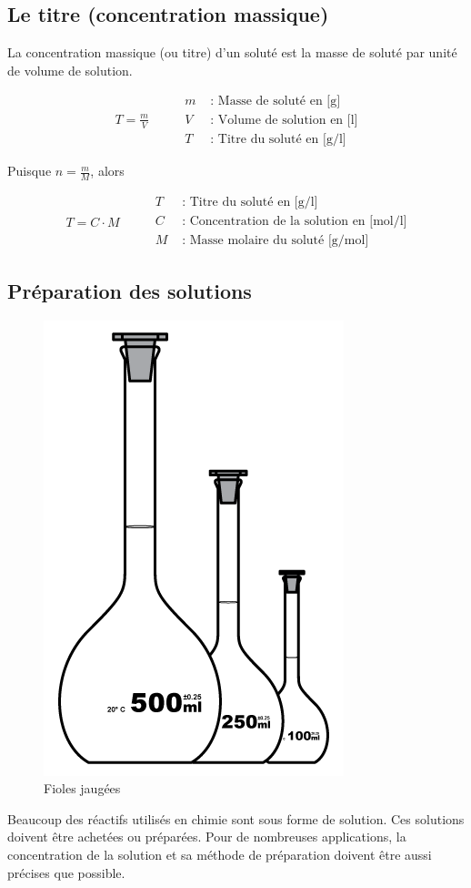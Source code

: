 \documentclass[
  11pt,
  a4paper,
  openany]{book}
\begin{document}
\subsection{Le titre (concentration massique)}\label{le-titre-concentration-massique}

La concentration massique (ou titre) d'un soluté est la masse de soluté par unité de volume de solution.

\[
\begin{split}
  T = \frac{m}{V}
\end{split}
\qquad
\begin{split}
  m &\text{ : Masse de soluté en [g]} \\
  V &\text{ : Volume de solution en [l]} \\
  T &\text{ : Titre du soluté en [g/l]}
\end{split}
\]

Puisque \(n = \frac{m}{M}\), alors

\[
\begin{split}
  T = C \cdot M
\end{split}
\qquad
\begin{split}
  T &\text{ : Titre du soluté en [g/l]} \\
  C &\text{ : Concentration de la solution en [mol/l]} \\
  M &\text{ : Masse molaire du soluté [g/mol]}
\end{split}
\]

\subsection{Préparation des solutions}\label{pruxe9paration-des-solutions}

\begin{figure}

{\centering \includegraphics[width=0.2\linewidth]{images/fiole} 

}

\caption{Fioles jaugées}\label{fig:fiole}
\end{figure}

Beaucoup des réactifs utilisés en chimie sont sous forme de solution. Ces solutions doivent être achetées ou préparées. Pour de nombreuses applications, la concentration de la solution et sa méthode de préparation doivent être aussi précises que possible.
\end{document}
